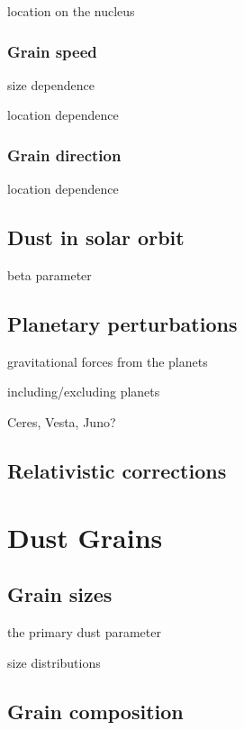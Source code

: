 \documentclass[12pt,letterpaper]{article}
\begin{document}
location on the nucleus


\subsubsection{Grain speed}

size dependence

location dependence

\subsubsection{Grain direction}

location dependence

\subsection{Dust in solar orbit}

beta parameter

\subsection{Planetary perturbations}

gravitational forces from the planets

including/excluding planets

Ceres, Vesta, Juno?

\subsection{Relativistic corrections}


\section{Dust Grains}\label{sec:grains}

\subsection{Grain sizes}

the primary dust parameter

size distributions

\subsection{Grain composition}
\end{document}
